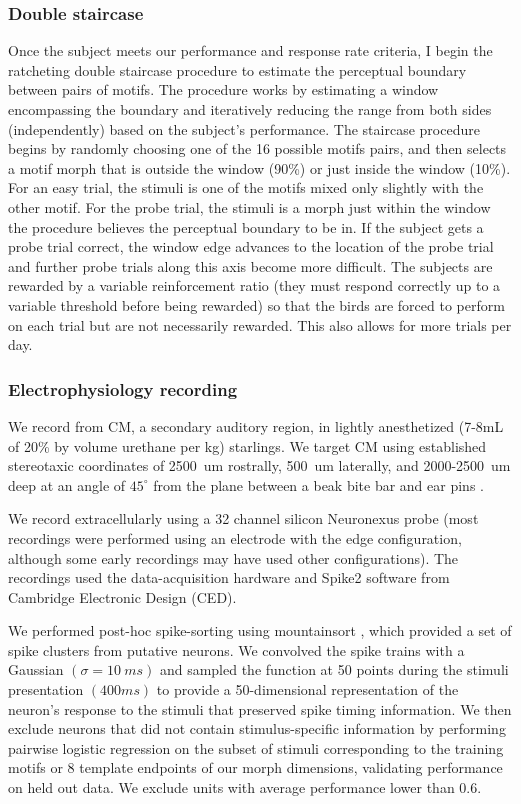 \subsubsection{Double staircase}
Once the subject meets our performance and response rate criteria, I begin the ratcheting double staircase procedure to estimate the perceptual boundary between pairs of motifs. The procedure works by estimating a window encompassing the boundary and iteratively reducing the range from both sides (independently) based on the subject's performance. The staircase procedure begins by randomly choosing one of the 16 possible motifs pairs, and then selects a motif morph that is outside the window (90\%) or just inside the window (10\%). For an easy trial, the stimuli is one of the motifs mixed only slightly with the other motif. For the probe trial, the stimuli is a morph just within the window the procedure believes the perceptual boundary to be in. If the subject gets a probe trial correct, the window edge advances to the location of the probe trial and further probe trials along this axis become more difficult. The subjects are rewarded by a variable reinforcement ratio (they must respond correctly up to a variable threshold before being rewarded) so that the birds are forced to perform on each trial but are not necessarily rewarded. This also allows for more trials per day.

\subsubsection{Electrophysiology recording}

We record from \ac{CM}, a secondary auditory region, in lightly anesthetized (7-8mL of 20\% by volume urethane per kg) starlings. We target \ac{CM} using established stereotaxic coordinates of \SI{2500}{um} rostrally, \SI{500}{um} laterally, and 2000-\SI{2500}{um} deep at an angle of $45^\circ$ from the plane between a beak bite bar and ear pins \cite{knudsen2013active}.

We record extracellularly using a 32 channel silicon Neuronexus probe (most recordings were performed using an electrode with the edge configuration, although some early recordings may have used other configurations). The recordings used the data-acquisition hardware and Spike2 software from Cambridge Electronic Design (CED).

We performed post-hoc spike-sorting using mountainsort \cite{mountainsort}, which provided a set of spike clusters from putative neurons. We convolved the spike trains with a Gaussian $(\sigma=\SI{10}{ms})$ and sampled the function at 50 points during the stimuli presentation $(400 ms)$ to provide a 50-dimensional representation of the neuron's response to the stimuli that preserved spike timing information. We then exclude neurons that did not contain stimulus-specific information by performing pairwise logistic regression on the subset of stimuli corresponding to the training motifs or 8 template endpoints of our morph dimensions, validating performance on held out data. We exclude units with average performance lower than 0.6.

